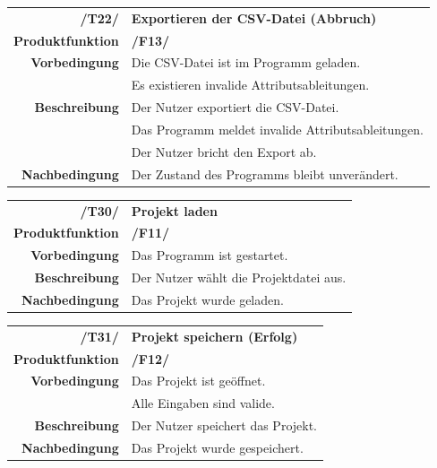 \documentclass{article}
\begin{document}
\begin{table}[H]
\begin{tabularx}{\textwidth}{rX}
 \vspace{1mm}
\textbf{/T22/}         & \textbf{Exportieren der CSV-Datei (Abbruch)} \\ \vspace{1mm}
\textbf{Produktfunktion} & \textbf{/F13/} \\
\textbf{Vorbedingung}  & Die CSV-Datei ist im Programm geladen. \\  \vspace{1mm}& Es existieren invalide Attributsableitungen. \\
\textbf{Beschreibung}  & Der Nutzer exportiert die CSV-Datei. \\ & Das Programm meldet invalide Attributsableitungen. \\ \vspace{1mm} & Der Nutzer bricht den Export ab. \\
\textbf{Nachbedingung} & Der Zustand des Programms bleibt unverändert.
\end{tabularx}
\end{table}

\begin{table}[H]
\begin{tabularx}{\textwidth}{rX}
 \vspace{1mm}
\textbf{/T30/}         & \textbf{Projekt laden} \\ \vspace{1mm}
\textbf{Produktfunktion} & \textbf{/F11/} \\ \vspace{1mm}
\textbf{Vorbedingung}  & Das Programm ist gestartet.   \\ \vspace{1mm}
\textbf{Beschreibung}  & Der Nutzer wählt die Projektdatei aus. \\
\textbf{Nachbedingung} & Das Projekt wurde geladen.
\end{tabularx}
\end{table}

\begin{table}[H]
\begin{tabularx}{\textwidth}{rX}
 \vspace{1mm}
\textbf{/T31/}         & \textbf{Projekt speichern (Erfolg)} \\ \vspace{1mm}
\textbf{Produktfunktion} & \textbf{/F12/} \\
\textbf{Vorbedingung}  & Das Projekt ist geöffnet.   \\ \vspace{1mm} & Alle Eingaben sind valide. \\ \vspace{1mm}
\textbf{Beschreibung}  & Der Nutzer speichert das Projekt. \\
\textbf{Nachbedingung} & Das Projekt wurde gespeichert.
\end{tabularx}
\end{table}
\end{document}
